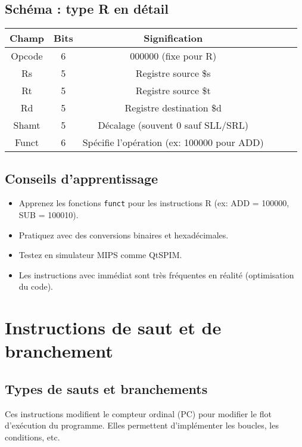 \documentclass[12pt,a4paper]{article}
\begin{document}
\subsection{Schéma : type R en détail}
\begin{center}
\begin{tabular}{|c|c|c|c|c|c|}
\hline
\textbf{Champ} & \textbf{Bits} & \textbf{Signification} \\
\hline
Opcode & 6 & 000000 (fixe pour R) \\
Rs & 5 & Registre source \$s \\
Rt & 5 & Registre source \$t \\
Rd & 5 & Registre destination \$d \\
Shamt & 5 & Décalage (souvent 0 sauf SLL/SRL) \\
Funct & 6 & Spécifie l’opération (ex: 100000 pour ADD) \\
\hline
\end{tabular}
\end{center}

\subsection{Conseils d’apprentissage}
\begin{itemize}
  \item Apprenez les fonctions \texttt{funct} pour les instructions R (ex: ADD = 100000, SUB = 100010).
  \item Pratiquez avec des conversions binaires et hexadécimales.
  \item Testez en simulateur MIPS comme QtSPIM.
  \item Les instructions avec immédiat sont très fréquentes en réalité (optimisation du code).
\end{itemize}

\newpage

\section{Instructions de saut et de branchement}

\subsection{Types de sauts et branchements}
Ces instructions modifient le compteur ordinal (PC) pour modifier le flot d'exécution du programme. Elles permettent d’implémenter les boucles, les conditions, etc.
\end{document}
